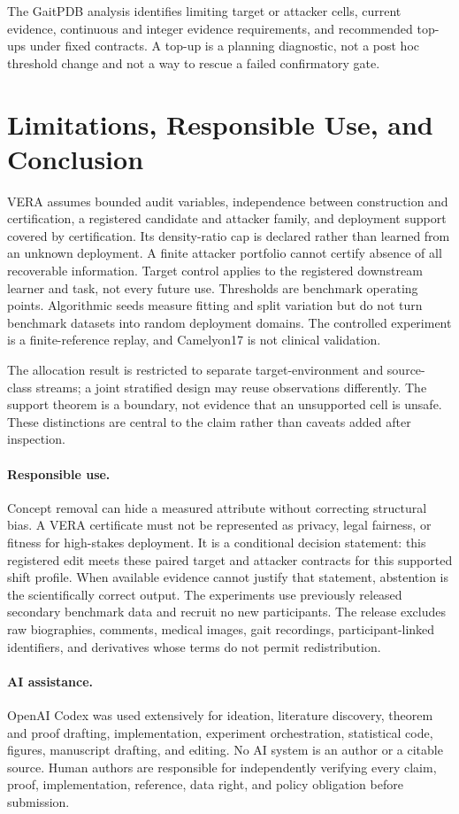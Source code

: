 \ControlledGaitResult{} The GaitPDB analysis identifies limiting target or
attacker cells, current evidence, continuous and integer evidence requirements,
and recommended top-ups under fixed contracts. A top-up is a planning
diagnostic, not a post hoc threshold change and not a way to rescue a failed
confirmatory gate.

\section{Limitations, Responsible Use, and Conclusion}
\label{iclr:sec:limits}

VERA assumes bounded audit variables, independence between construction and
certification, a registered candidate and attacker family, and deployment
support covered by certification. Its density-ratio cap is declared rather than
learned from an unknown deployment. A finite attacker portfolio cannot certify
absence of all recoverable information. Target control applies to the
registered downstream learner and task, not every future use. Thresholds are
benchmark operating points. Algorithmic seeds measure fitting and split
variation but do not turn benchmark datasets into random deployment domains.
The controlled experiment is a finite-reference replay, and Camelyon17 is not
clinical validation.

The allocation result is restricted to separate target-environment and source-
class streams; a joint stratified design may reuse observations differently.
The support theorem is a boundary, not evidence that an unsupported cell is
unsafe. These distinctions are central to the claim rather than caveats added
after inspection.

\paragraph{Responsible use.}
Concept removal can hide a measured attribute without correcting structural
bias. A VERA certificate must not be represented as privacy, legal fairness, or
fitness for high-stakes deployment. It is a conditional decision statement:
this registered edit meets these paired target and attacker contracts for this
supported shift profile. When available evidence cannot justify that statement,
abstention is the scientifically correct output. The experiments use previously
released secondary benchmark data and recruit no new participants. The release
excludes raw biographies, comments, medical images, gait recordings,
participant-linked identifiers, and derivatives whose terms do not permit
redistribution.

\paragraph{AI assistance.}
OpenAI Codex was used extensively for ideation, literature discovery, theorem
and proof drafting, implementation, experiment orchestration, statistical code,
figures, manuscript drafting, and editing. No AI system is an author or a
citable source. Human authors are responsible for independently verifying every
claim, proof, implementation, reference, data right, and policy obligation
before submission.
